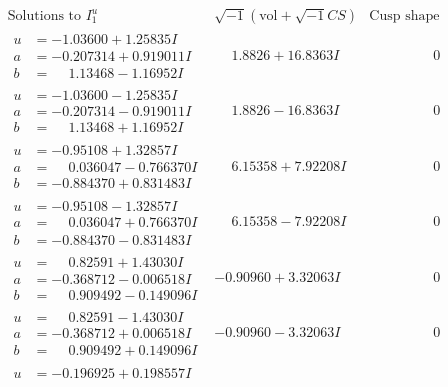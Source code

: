 \documentclass[1p]{elsarticle_modified}
\theoremstyle{definition}
\newcommand{\I}{\sqrt{-1}}
\begin{document}
$$\begin{array}{c|c|c}
\text{Solutions to }I^u_{1}& \I (\text{vol} + \sqrt{-1}CS) & \text{Cusp shape}\\
 \hline 
\begin{aligned}
u &= -1.03600 + 1.25835 I \\
a &= -0.207314 + 0.919011 I \\
b &= \phantom{-}1.13468 - 1.16952 I\end{aligned}
 & \phantom{-}1.8826 + 16.8363 I & \phantom{-0.000000 } 0 \\ \hline\begin{aligned}
u &= -1.03600 - 1.25835 I \\
a &= -0.207314 - 0.919011 I \\
b &= \phantom{-}1.13468 + 1.16952 I\end{aligned}
 & \phantom{-}1.8826 - 16.8363 I & \phantom{-0.000000 } 0 \\ \hline\begin{aligned}
u &= -0.95108 + 1.32857 I \\
a &= \phantom{-}0.036047 - 0.766370 I \\
b &= -0.884370 + 0.831483 I\end{aligned}
 & \phantom{-}6.15358 + 7.92208 I & \phantom{-0.000000 } 0 \\ \hline\begin{aligned}
u &= -0.95108 - 1.32857 I \\
a &= \phantom{-}0.036047 + 0.766370 I \\
b &= -0.884370 - 0.831483 I\end{aligned}
 & \phantom{-}6.15358 - 7.92208 I & \phantom{-0.000000 } 0 \\ \hline\begin{aligned}
u &= \phantom{-}0.82591 + 1.43030 I \\
a &= -0.368712 - 0.006518 I \\
b &= \phantom{-}0.909492 - 0.149096 I\end{aligned}
 & -0.90960 + 3.32063 I & \phantom{-0.000000 } 0 \\ \hline\begin{aligned}
u &= \phantom{-}0.82591 - 1.43030 I \\
a &= -0.368712 + 0.006518 I \\
b &= \phantom{-}0.909492 + 0.149096 I\end{aligned}
 & -0.90960 - 3.32063 I & \phantom{-0.000000 } 0 \\ \hline\begin{aligned}
u &= -0.196925 + 0.198557 I \\

\end{aligned}
\end{array}$$
\end{document}

